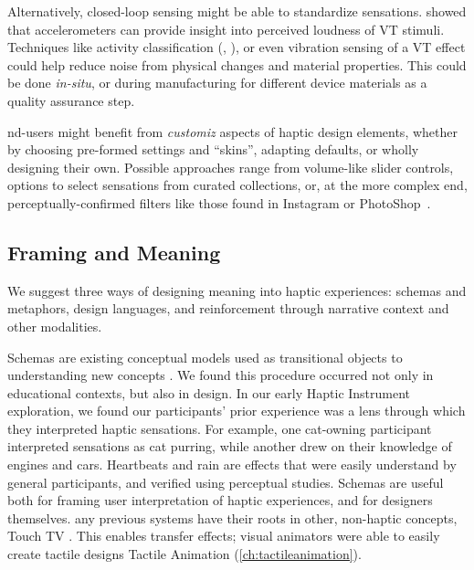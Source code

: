 Alternatively, closed-loop sensing might be able to standardize sensations.
\citet{Blum2015} showed that accelerometers can provide insight into perceived loudness of VT stimuli.
Techniques like activity classification (\eg, \cite{Schneider2013}), or even vibration sensing of a VT effect could help reduce noise from physical changes and material properties.
This could be done \emph{in-situ}, or during manufacturing for different device materials as a quality assurance step.

nd-users might benefit from \textit{customiz} aspects of haptic design elements, whether by choosing pre-formed settings and ``skins'', adapting defaults, or wholly designing their own. 
Possible approaches range from volume-like slider controls, options to select sensations from curated collections, or, at the more complex end, perceptually-confirmed filters like those found in Instagram or PhotoShop~\cite{Seifi2014,Seifi2015,SchneiderAsiaHaptics2014}.


%
%
\subsection{Framing and Meaning}
\label{ch:conclusion:framing}
We suggest three ways of designing meaning into haptic experiences:
schemas and metaphors,
design languages,
and reinforcement through narrative context and other modalities.



Schemas are existing conceptual models used as transitional objects to understanding new concepts \cite{Papert1980}.
We found this procedure occurred not only in educational contexts, but also in design.
In our early Haptic Instrument exploration, we found our participants' prior experience was a lens through which they interpreted haptic sensations.
For example, one cat-owning participant interpreted sensations as cat purring, while another drew on their knowledge of engines and cars.
Heartbeats and rain \cite{Israr2014} are effects that were easily understand by general participants, and verified using perceptual studies.
Schemas are useful both for framing user interpretation of haptic experiences, and for designers themselves.
any previous systems have their roots in other, non-haptic concepts, \eg Touch TV \cite{Modhrain2001}.
This enables transfer effects; visual animators were able to easily create tactile designs  Tactile Animation (\autoref{ch:tactileanimation}).

